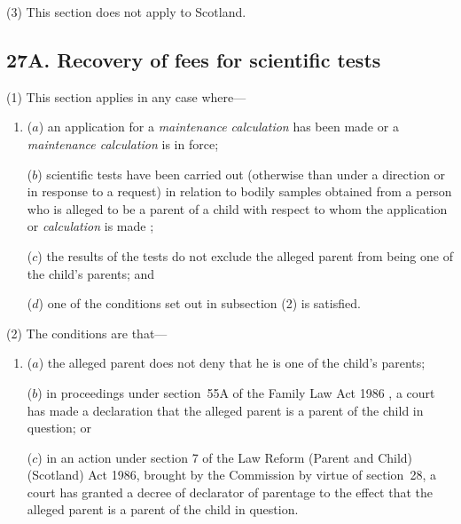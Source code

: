\documentclass[12pt,a4paper]{article}
\begin{document}
(3) This section does not apply to Scotland.


\subsection{27A. Recovery of fees for scientific tests}

(1) This section applies in any case where—
\begin{enumerate}\item[]
($a$) an application for a 
\emph{maintenance calculation}  %
has been made 
or a 
\emph{maintenance calculation}  %
is in force;

($b$) scientific tests have been carried out (otherwise than under a direction or in response to a request) in relation to bodily samples obtained from a person who is alleged to be a parent of a child with respect to whom the application or 
\emph{calculation}  %
is made%
;

($c$) the results of the tests do not exclude the alleged parent from being one of the child’s parents; and

($d$) one of the conditions set out in subsection (2) is satisfied.
\end{enumerate}

(2) The conditions are that—
\begin{enumerate}\item[]
($a$) the alleged parent does not deny that he is one of the child’s parents;

($b$) in proceedings under 
section~55A of the Family Law Act 1986%
, a court has made a declaration that the alleged parent is a parent of the child in question; or

($c$) in an action under section 7 of the Law Reform (Parent and Child) (Scotland) Act 1986, brought by the 
Commission  %
by virtue of section~28, a court has granted a decree of declarator of parentage to the effect that the alleged parent is a parent of the child in question.
\end{enumerate}
\end{document}
